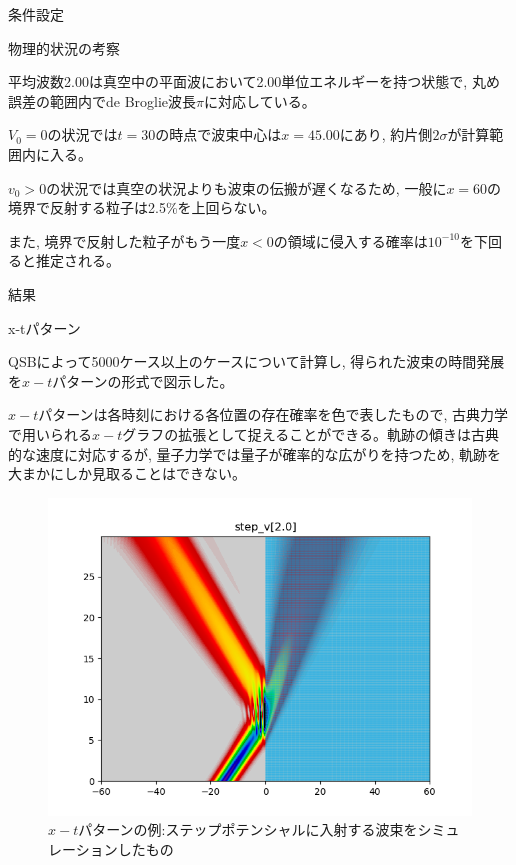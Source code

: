\documentclass[a4paper, lualatex]{bxjsarticle}
\begin{document}
\begin{section}{条件設定}
\begin{subsection}{物理的状況の考察}
        \par 平均波数2.00は真空中の平面波において2.00単位エネルギーを持つ状態で, 丸め誤差の範囲内でde Broglie波長$\pi$に対応している。
        \par $V_0=0$の状況では$t=30$の時点で波束中心は$x=45.00$にあり, 約片側$2\sigma$が計算範囲内に入る。
        \par $v_0>0$の状況では真空の状況よりも波束の伝搬が遅くなるため, 一般に$x=60$の境界で反射する粒子は2.5\%を上回らない。
        \par また, 境界で反射した粒子がもう一度$x<0$の領域に侵入する確率は$10^{-10}$を下回ると推定される。
    \end{subsection}
\end{section}

\newpage

\begin{section}{結果}
    \begin{subsection}{x-tパターン\label{x-tpatturn}}
        \par QSBによって5000ケース以上のケースについて計算し, 得られた波束の時間発展を$x-t$パターンの形式で図示した。
        \par $x-t$パターンは各時刻における各位置の存在確率を色で表したもので, 古典力学で用いられる$x-t$グラフの拡張として捉えることができる。軌跡の傾きは古典的な速度に対応するが, 量子力学では量子が確率的な広がりを持つため, 軌跡を大まかにしか見取ることはできない。
        \begin{figure}[h]
            \centering
            \includegraphics[width=\hsize]{rei.png}
            \caption{$x-t$パターンの例:ステップポテンシャルに入射する波束をシミュレーションしたもの}

\end{figure}
\end{subsection}
\end{section}
\end{document}
